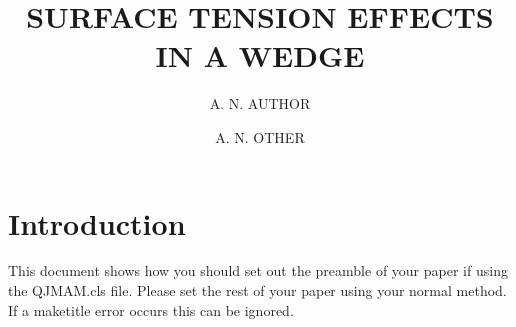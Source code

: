 \documentclass{qjmam}
\renewcommand{\.}{\raisebox{.9mm}{.}}
\begin{document}
\title[{surface~tension~effects~in~a~wedge}] {SURFACE TENSION EFFECTS IN A WEDGE}


\author[a.~n.~author \etal] {A. N. AUTHOR \and A. N. OTHER}

\address{Mathematics Department, University of Western Australia,\\
Nedlands, Western Australia {\rm 6009}, Australia}





\maketitle

\eqnobysec

\begin{abstract} 

\end{abstract}


\section{Introduction}
This document shows how you should set out the preamble of your paper if
using the QJMAM.cls file. Please set the rest of your paper using your
normal method. If a maketitle error occurs this can be ignored.
\end{document}
